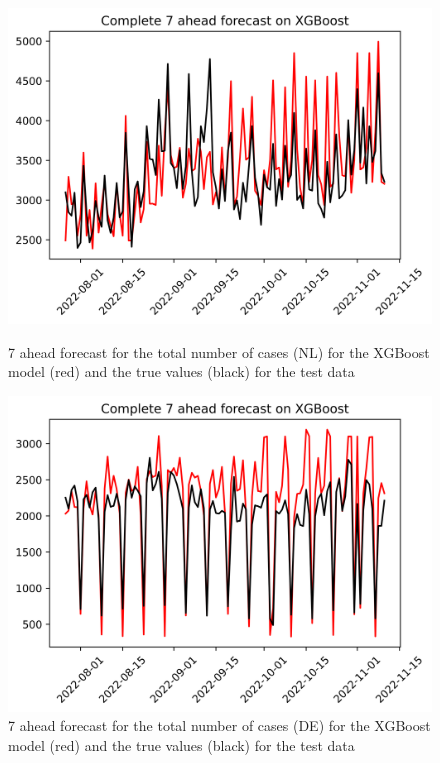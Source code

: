 \begin{figure}

\begin{minipage}{.45\textwidth}
  \centering
  \includegraphics[width=\linewidth]{pics/7_ah/Complete_7_ahead_XGBoost.png}
  \caption{7 ahead forecast for the total number of cases (NL) for the XGBoost model (red) and the true values (black) for the test data}
  \label{fig:tot_cases_fc_7_xgb}
\end{minipage}
\begin{minipage}{.45\textwidth}
  \centering
  \includegraphics[width=\linewidth]{pics/7_ah/DE_Complete_7_ahead_XGBoost.png}
  \caption{7 ahead forecast for the total number of cases (DE) for the XGBoost model (red) and the true values (black) for the test data}
  \label{fig:tot_cases_fc_7_xgb_DE}
\end{minipage}

\end{figure}
